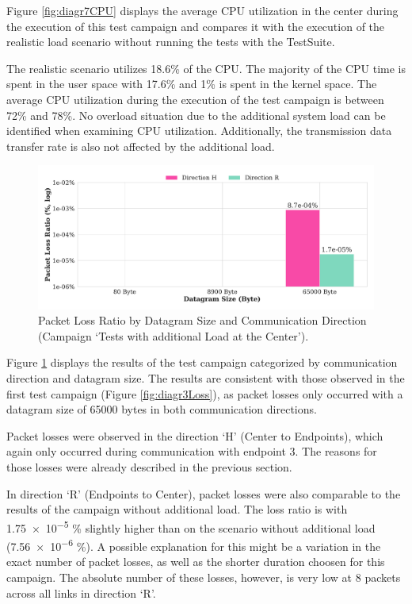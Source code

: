 Figure \ref{fig:diagr7CPU} displays the average CPU utilization in the center during the execution of this test campaign and compares it with the execution of the realistic load scenario without running the tests with the TestSuite.

The realistic scenario utilizes 18.6\% of the CPU. The majority of the CPU time is spent in the user space with 17.6\% and 1\% is spent in the kernel space. The average CPU utilization during the execution of the test campaign is between 72\% and 78\%. No overload situation due to the additional system load can be identified when examining CPU utilization. Additionally, the transmission data transfer rate is also not affected by the additional load.

\begin{figure}[h]
    \centering
    \includegraphics[width=1\linewidth]{figures/reliability/ihawk/diagr8.pdf}
    \caption{Packet Loss Ratio by Datagram Size and Communication Direction (Campaign `Tests with additional Load at the Center').}
    \label{fig:diagr8Loss}
\end{figure}

Figure \ref{fig:diagr8Loss} displays the results of the test campaign categorized by communication direction and datagram size. The results are consistent with those observed in the first test campaign (Figure \ref{fig:diagr3Loss}), as packet losses only occurred with a datagram size of 65000 bytes in both communication directions.

Packet losses were observed in the direction `H' (Center to Endpoints), which again only occurred during communication with endpoint 3. The reasons for those losses were already described in the previous section.

In direction `R' (Endpoints to Center), packet losses were also comparable to the results of the campaign without additional load. The loss ratio is with \num{1.75e-5} \% slightly higher than on the scenario without additional load (\num{7.56e-6} \%). A possible explanation for this might be a variation in the exact number of packet losses, as well as the shorter duration choosen for this campaign. The absolute number of these losses, however, is very low at 8 packets across all links in direction `R'.

